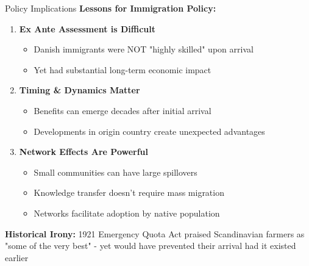 \documentclass{beamer}
\begin{document}
\begin{frame}{Policy Implications}
\textbf{Lessons for Immigration Policy:}
\begin{enumerate}
    \item \textbf{Ex Ante Assessment is Difficult}
    \begin{itemize}
        \item Danish immigrants were NOT "highly skilled" upon arrival
        \item Yet had substantial long-term economic impact
    \end{itemize}
    
    \item \textbf{Timing \& Dynamics Matter}
    \begin{itemize}
        \item Benefits can emerge decades after initial arrival
        \item Developments in origin country create unexpected advantages
    \end{itemize}
    
    \item \textbf{Network Effects Are Powerful}
    \begin{itemize}
        \item Small communities can have large spillovers
        \item Knowledge transfer doesn't require mass migration
        \item Networks facilitate adoption by native population
    \end{itemize}
\end{enumerate}

\vspace{0.3cm}
\textbf{Historical Irony:} 1921 Emergency Quota Act praised Scandinavian farmers as "some of the very best" - yet would have prevented their arrival had it existed earlier
\end{frame}
\end{document}
